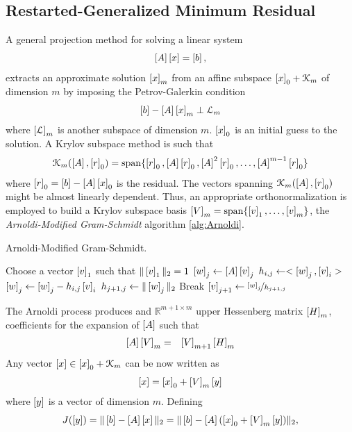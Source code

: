 \subsection{Restarted-Generalized Minimum Residual}

A general projection method for solving a linear system 
$$ \left[A\right] \left[{{x}}\right] = \left[{{b}}\right], $$ 
\noindent extracts an approximate solution $\left[{{x}}\right]_m$ from an affine subspace $\left[{{x}}\right]_0 + \mathcal{K}_m$ of dimension $m$ by imposing the Petrov-Galerkin condition
$$ \left[{{b}}\right] - \left[A\right]\left[{{x}}\right]_m \perp \mathcal{L}_m$$
\noindent where $\left[\mathcal{L}\right]_m$ is another subspace of dimension $m$. $\left[x\right]_0$ is an initial guess to the solution.
A Krylov subspace method is such that
$$\mathcal{K}_m(\left[A\right],\left[{{r}}\right]_0) = \mathrm{span}\{\left[{{r}}\right]_0, \left[A\right]\left[{{r}}\right]_0, \left[A\right]^2\left[{{r}}\right]_0,\ldots,\left[A\right]^{m-1}\left[{{r}}\right]_0\} $$
\noindent where $\left[{{r}}\right]_0 = \left[{{b}}\right]-\left[A\right]\left[{{x}}\right]_0$ is the residual. The vectors spanning $\mathcal{K}_m(\left[A\right],\left[{{r}}\right]_0)$ might be almost linearly dependent. Thus, an appropriate orthonormalization is employed to build a Krylov subspace basis $\left[V\right]_m = \mathrm{span}\{\left[{{v}}\right]_1,\ldots,\left[{{v}}\right]_m \}$, the \textit{Arnoldi-Modified Gram-Schmidt} algorithm \ref{alg:Arnoldi}.
\begin{algorithm}[ht!]
\begin{algorithmic}
\caption{Arnoldi-Modified Gram-Schmidt.}
\label{alg:Arnoldi}
\State Choose a vector $\left[{{v}}\right]_1$ such that $\Vert \left[{{v}}\right]_1 \Vert_2 = 1$
    \State $\left[{{w}}\right]_j \gets \left[A\right] \left[{{v}}\right]_j$
    	\State $h_{i,j} \gets <\left[{{w}}\right]_j,\left[{{v}}\right]_i>$
		\State $\left[{{w}}\right]_j \gets \left[{{w}}\right]_j - h_{i,j} \left[{{v}}\right]_i$
    \EndFor
    \State $h_{j+1,j} \gets \Vert \left[{{w}}\right]_j \Vert_2$
     \State Break \EndIf
    \State $\left[{{v}}\right]_{j+1} \gets \nicefrac{\left[{{w}}\right]_j}{h_{j+1,j}} $
\EndFor
\end{algorithmic}
\end{algorithm}
%
\noindent The Arnoldi process produces and $\mathbb{R}^{m+1 \times m}$ upper Hessenberg matrix $\left[H\right]_m$, coefficients for the expansion of $\left[A\right]$ such that
\begin{eqnarray}
\label{eq:Hess}
\left[A\right] \left[V\right]_m &= &\left[V\right]_{m+1} \left[H\right]_m
\end{eqnarray}
\noindent Any vector $\left[{{x}}\right] \in \left[{{x}}\right]_0 + \mathcal{K}_m$ can be now written as
$$\left[{{x}}\right] = \left[{{x}}\right]_0 + \left[V\right]_m \left[{{y}}\right]$$
\noindent where $\left[{{y}}\right]$ is a vector of dimension $m$. Defining 
$$J(\left[{{y}}\right]) = \Vert \left[{{b}}\right] - \left[A\right] \left[{{x}}\right] \Vert_2 = \Vert \left[{{b}}\right] - \left[A\right] (\left[{{x}}\right]_0 + \left[V\right]_m \left[{{y}}\right])\Vert_2,$$

